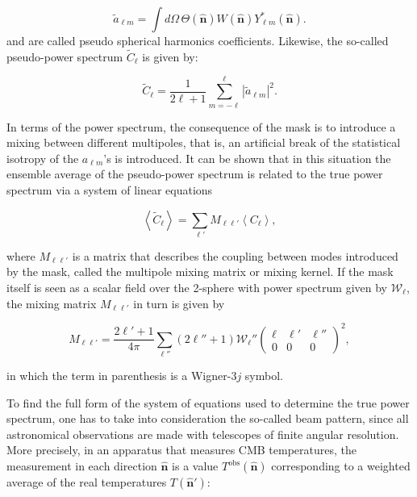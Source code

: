 \documentclass[openany,a4paper,12pt,oneside]{book}
\newcommand{\av}[1]{\left\langle #1 \right\rangle} %
\begin{document}
\begin{spacing}{1.5}
\begin{equation}\label{ch3:tilde_a}
    \tilde{a}_{\ell m}=\int d\Omega\, \Theta(\hat{\mathbf{n}})W(\hat{\mathbf{n}})Y_{\ell m}^* (\hat{\mathbf{n}}).
  \end{equation}
  and are called pseudo spherical harmonics coefficients. Likewise, the so-called pseudo-power spectrum $\tilde{C}_\ell$ is given by:
  
\begin{equation}\label{ch3:tilde_Cl}
    \tilde{C}_\ell=\frac{1}{2\ell+1}\sum_{m=-\ell}^\ell |\tilde{a}_{\ell m}|^2.
\end{equation}

In terms of the power spectrum, the consequence of the mask is to introduce a mixing between different multipoles, that is, an artificial break of the statistical isotropy of the $a_{\ell m}$'s is introduced. It can be shown that in this situation the ensemble average of the pseudo-power spectrum is related to the true power spectrum via a system of linear equations \cite{Hivon_2002}

\begin{equation}
    \av{\tilde{C}_\ell}=\sum_{\ell'} M_{\ell \ell'} \av{C_\ell},
\end{equation}

\noindent where $M_{\ell \ell'}$ is a matrix that describes the coupling between modes introduced by the mask, called the multipole mixing matrix or mixing kernel. If the mask itself is seen as a scalar field over the 2-sphere with power spectrum given by $\mathcal{W}_\ell$, the mixing matrix $M_{\ell \ell'}$ in turn is given by

\begin{equation}
    M_{\ell \ell'}=\frac{2\ell'+1}{4\pi}\sum_{\ell''}(2\ell''+1)\mathcal{W}_\ell''
    \begin{pmatrix}
        \ell & \ell' & \ell''\\
        0 & 0 & 0
    \end{pmatrix}^2,
\end{equation}

\noindent in which the term in parenthesis is a Wigner-$3j$ symbol.

To find the full form of the system of equations used to determine the true power spectrum, one has to take into consideration the so-called beam pattern, since all astronomical observations are made with telescopes of finite angular resolution. More precisely, in an apparatus that measures CMB temperatures, the measurement in each direction $\hat{\mathbf{n}}$ is a value $T^\text{obs}(\hat{\mathbf{n}})$ corresponding to a weighted average of the real temperatures $T(\hat{\mathbf{n}} ')$:


\end{spacing}
\end{document}
